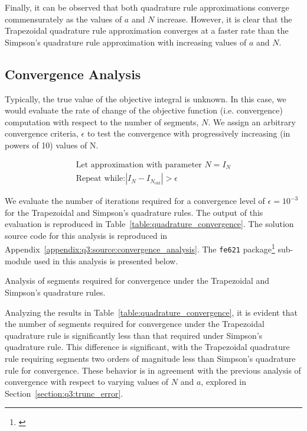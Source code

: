 \documentclass[10pt]{article}
\begin{document}
    Finally, it can be observed that both quadrature rule approximations converge commensurately as the values of $a$ and $N$ increase. However, it is clear that the Trapezoidal quadrature rule approximation converges at a faster rate than the Simpson's quadrature rule approximation with increasing values of $a$ and $N$.


    \subsection{Convergence Analysis} 

    Typically, the true value of the objective integral is unknown. In this case, we would evaluate the rate of change of the objective function (i.e. convergence) computation with respect to the number of segments, $N$. We assign an arbitrary convergence criteria, $\epsilon$ to test the convergence with progressively increasing (in powers of 10) values of N.

    \begin{gather*}
        \text{Let approximation with parameter $N$} = I_N \\
        \text{Repeat while:} \left| I_N - I_{N_\text{old}} \right| > \epsilon
    \end{gather*}

    We evaluate the number of iterations required for a convergence level of $\epsilon = 10^{-3}$ for the Trapezoidal and Simpson's quadrature rules. The output of this evaluation is reproduced in Table~\ref{table:quadrature_convergence}. The solution source code for this analysis is reproduced in Appendix~\ref{appendix:q3:source:convergence_analysis}. The \texttt{fe621} package\footnote{\cite{Weerawarana2019}} sub-module used in this analysis is presented below.

    

    \begin{table}[h]
        \centering
        \caption{Analysis of segments required for convergence under the Trapezoidal and Simpson's quadrature rules.}
        \label{table:quadrature_convergence}
    \end{table}

    Analyzing the results in Table~\ref{table:quadrature_convergence}, it is evident that the number of segments required for convergence under the Trapezoidal quadrature rule is significantly less than that required under Simpson's quadrature rule. This difference is significant, with the Trapezoidal quadrature rule requiring segments two orders of magnitude less than Simpson's quadrature rule for convergence. These behavior is in agreement with the previous analysis of convergence with respect to varying values of $N$ and $a$, explored in Section~\ref{section:q3:trunc_error}.
\end{document}
